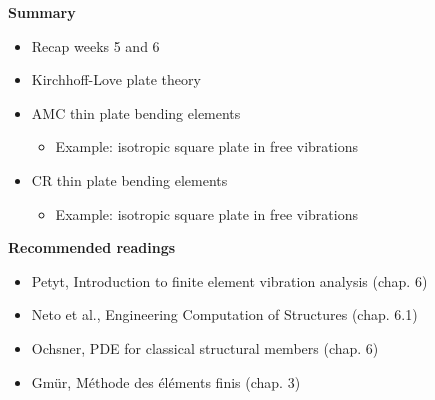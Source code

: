 \documentclass[aspectratio=169]{beamer}
\begin{document}
{  \begin{frame}
    \textbf{\large Summary}
    \begin{itemize}
      \item Recap weeks 5 and 6
      \item Kirchhoff-Love plate theory
      \item AMC thin plate bending elements
            \begin{itemize}
              \item Example: isotropic square plate in free vibrations
            \end{itemize}
      \item CR thin plate bending elements
            \begin{itemize}
              \item Example: isotropic square plate in free vibrations
            \end{itemize}
    \end{itemize}
    \vspace{.5cm}

    \textbf{\large Recommended readings}
    \begin{itemize}
      \item[(P)] Petyt, Introduction to finite element vibration analysis (chap. 6)
      \item[(N)] Neto et al., Engineering Computation of Structures (chap. 6.1)
      \item[(O)] Ochsner, PDE for classical structural members (chap. 6)
      \item[(G)]  Gmür, Méthode des éléments finis (chap. 3)
    \end{itemize}
  \end{frame}
}
\end{document}

